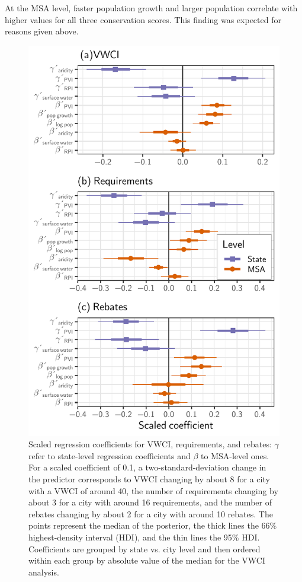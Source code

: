 \documentclass[draft,linenumbers]{agujournal}\usepackage{knitr}
\begin{document}
At the MSA level, faster population growth and larger population correlate with higher values
for all three conservation scores.
This finding was expected for reasons given above.
%
%
\begin{figure}[p]

{\centering \includegraphics[width=0.8\linewidth]{figures_clean/vwci_cat_plot-1} 

}

\caption[Scaled regression coefficients for VWCI, requirements, and rebates]{Scaled regression coefficients for VWCI, requirements, and rebates: $\gamma$ refer to state-level regression coefficients and $\beta$ to MSA-level ones.
For a scaled coefficient of 0.1, a two-standard-deviation change in the predictor corresponds to VWCI changing by about 8 for a city with a VWCI of around 40, the number of requirements changing by about 3 for a city with around 16 requirements, and the number of rebates changing by about 2 for a city with around 10 rebates. The points represent the median of the posterior, the thick lines the 66\% highest-density interval (HDI), and the thin lines the 95\% HDI. Coefficients are grouped by state vs. city level and then ordered within each group by absolute value of the median for the VWCI analysis.}\label{fig:vwci_cat_plot}
\end{figure}
\end{document}
